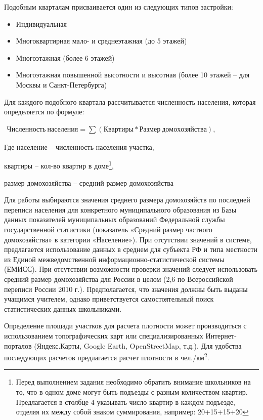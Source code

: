 \documentclass[
  11pt,
]{book}
\begin{document}
Подобным кварталам присваивается один из следующих типов застройки:

\begin{itemize}
\item
  Индивидуальная
\item
  Многоквартирная мало- и среднеэтажная (до 5 этажей)
\item
  Многоэтажная (более 6 этажей)
\item
  Многоэтажная повышенной высотности и высотная (более 10 этажей -- для Москвы и Санкт-Петербурга)
\end{itemize}

Для каждого подобного квартала рассчитывается численность населения, которая определяется по формуле:

\(\begin{aligned} Численность\ населения = \sum (Квартиры*Размер\ домохозяйства), \end{aligned}\)

Где население -- численность населения участка,

квартиры -- кол-во квартир в доме\footnote{Перед выполнением задания необходимо обратить внимание школьников на то, что в одном доме могут быть подъезды с разным количеством квартир. Предлагается в столбце 4 указывать число квартир в каждом подъезде, отделяя их между собой знаком суммирования, например: 20+15+15+20},

размер домохозяйства -- средний размер домохозяйства

Для работы выбираются значения среднего размера домохозяйств по последней переписи населения для конкретного муниципального образования из Базы данных показателей муниципальных образований Федеральной службы государственной статистики (показатель «Средний размер частного домохозяйства» в категории «Население»). При отсутствии значений в системе, предлагается использование данных в среднем для субъекта РФ и типа местности из Единой межведомственной информационно-статистической системы (ЕМИСС). При отсутствии возможности проверки значений следует использовать средний размер домохозяйства для России в целом (2,6 по Всероссийской переписи России 2010 г.). Предполагается, что значения должны быть выданы учащимся учителем, однако приветствуется самостоятельный поиск статистических данных школьниками.

Определение площади участков для расчета плотности может производиться с использованием топографических карт или специализированных Интернет-порталов (Яндекс.Карты, Google Earth, OpenStreetMap, т.д.). Для удобства последующих расчетов предлагается расчет плотности в чел./км\textsuperscript{2}.
\end{document}
